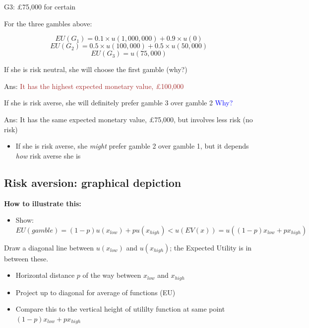 \documentclass[]{article}
\providecommand{\tightlist}{%
  \setlength{\itemsep}{0pt}\setlength{\parskip}{0pt}}
\begin{document}
G3: \pounds75,000 for certain

\bigskip

For the three gambles above:

\[EU(G_1)=0.1 \times u(1,000,000) + 0.9 \times u(0)\]
\[EU(G_2)= 0.5 \times u(100,000) + 0.5 \times u(50,000)\]
\[EU(G_3)= u(75,000)\]

\bigskip

If she is risk neutral, she will choose the first gamble (why?)

Ans:
\textcolor{brown}{It has the highest expected monetary value, \pounds100,000}

\bigskip

If she is risk averse, she will definitely prefer gamble 3 over gamble 2
\textcolor{blue}{Why?}

Ans: It has the same expected monetary value, £75,000, but involves less
risk (no risk)

\bigskip

\begin{itemize}
\tightlist
\item
  If she is risk averse, she \emph{might} prefer gamble 2 over gamble 1,
  but it depends \emph{how} risk averse she is
\end{itemize}

\hypertarget{risk-aversion-graphical-depiction}{%
\subsection{Risk aversion: graphical
depiction}\label{risk-aversion-graphical-depiction}}

\textbf{How to illustrate this:}

\begin{itemize}
\tightlist
\item
  Show:
  \(EU(gamble) = (1-p)u(x_{low}) + pu(x_{high}) < u(EV(x)) = u((1-p)x_{low} + px_{high})\)
\end{itemize}

Draw a diagonal line between \(u(x_{low})\) and \(u(x_{high})\); the
Expected Utility is in between these.

\begin{itemize}
\item
  Horizontal distance \(p\) of the way between \(x_{low}\) and
  \(x_{high}\)
\item
  Project up to diagonal for average of functions (EU)
\item
  Compare this to the vertical height of utililty function at same point
  \((1-p)x_{low} + px_{high}\)
\end{itemize}
\end{document}
